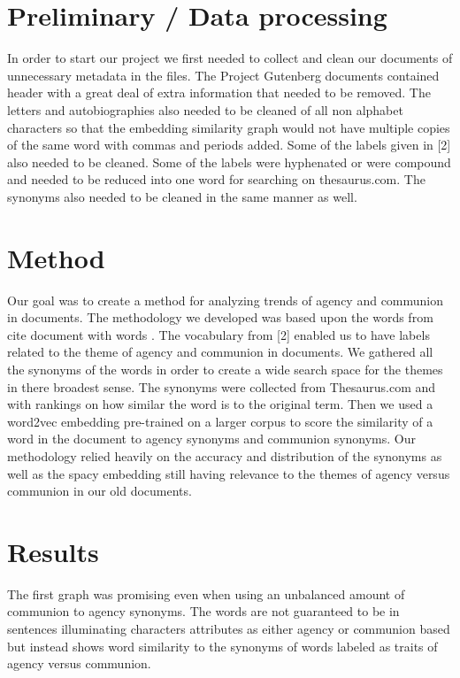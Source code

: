 \documentclass{article}
\begin{document}
\section{Preliminary / Data processing}
\label{preliminary}
In order to start our project we first needed to collect and clean our documents of unnecessary metadata in the files. The Project Gutenberg  documents contained header with a great deal of extra information that needed to be removed. The letters and autobiographies also needed to be cleaned of all non alphabet characters so that the embedding similarity graph would not have multiple copies of the same word with commas and periods added. Some of the labels given in [2] also needed to be cleaned. Some of the labels were hyphenated or were compound and needed to be reduced into one word for searching on thesaurus.com. The synonyms also needed to be cleaned in the same manner as well. 

\section{Method}
\label{method}
    Our goal was to create a method for analyzing  trends of agency and communion in documents. The methodology we developed was based upon the words from {cite document with words} . The vocabulary from [2] enabled us to have labels related to the theme of agency and communion in documents. We gathered all the synonyms of the words in order to create a wide search space for the themes in there broadest sense. The synonyms were collected from Thesaurus.com and with rankings on how similar the word is to the original term. Then we used a word2vec embedding pre-trained on a larger corpus to score the similarity of a word in the document to agency synonyms and communion synonyms. Our methodology relied heavily on the accuracy and distribution of the synonyms as well as the spacy embedding still having relevance to the themes of agency versus communion in our old documents. 
\section{Results}
\label{results}
    The first graph was promising even when using an unbalanced amount of communion to agency synonyms. The words are not guaranteed to be in sentences illuminating characters attributes as either agency or communion based but instead shows word similarity to the synonyms of words labeled as traits of agency versus communion. 
    
\end{document}
